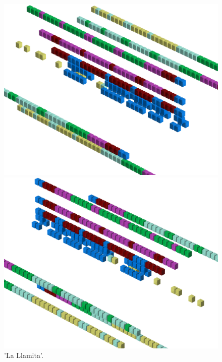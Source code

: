 \begin{figure}[H]
    \centering
    \begin{adjustbox}{width=12cm,center}
      \includegraphics[width=12cm]{src/patterns/pattern12-45.png}%
    \end{adjustbox}
    \begin{adjustbox}{width=12cm,margin=0cm -4cm}
      \includegraphics[width=12cm]{src/patterns/pattern12-225.png}%
    \end{adjustbox}
\caption{'La Llamita'.}
\end{figure}
\clearpage

